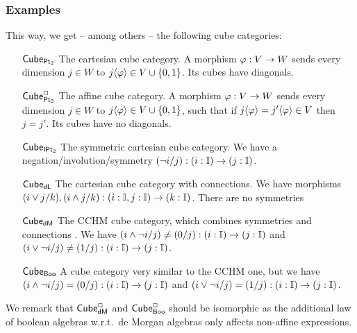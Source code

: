 \documentclass[a4paper]{article}
\begin{document}
\subsubsection{Examples}
This way, we get -- among others -- the following cube categories:
\begin{enumerate}
	\item[${\mathsf{Cube}}_{{\mathsf{Pt}_2}}$] The cartesian cube category.
	A morphism $\varphi : V \to W$ sends every dimension $j \in W$ to $j \langle \varphi \rangle \in V \cup \mathopen{}\left\{ 0, 1 \right\}\mathclose{}$.
	Its cubes have diagonals.
	\item[${\mathsf{Cube}}^\Box_{{\mathsf{Pt}_2}}$] The affine cube category.
	A morphism $\varphi : V \to W$ sends every dimension $j \in W$ to $j \langle \varphi \rangle \in V \cup \mathopen{}\left\{ 0, 1 \right\}\mathclose{}$, such that if $j\langle \varphi \rangle = j' \langle \varphi \rangle \in V$ then $j = j'$.
	Its cubes have no diagonals.
	\item[${\mathsf{Cube}}_{{\mathsf{IPt}_2}}$] The symmetric cartesian cube category. We have a negation/involution/symmetry $(\lnot i / j) : (i : {\mathbb I}) \to (j : {\mathbb I})$.
	\item[${\mathsf{Cube}}_{\mathsf{dL}}$] The cartesian cube category with connections. We have morphisms $(i \vee j / k), (i \wedge j / k) : (i : {\mathbb I}, j : {\mathbb I}) \to (k : {\mathbb I})$. There are no symmetries
	\item[${\mathsf{Cube}}_{\mathsf{dM}}$] The CCHM cube category, which combines symmetries and connections \cite{cubical}. We have $(i \wedge \lnot i / j) \neq (0/j) : (i : {\mathbb I}) \to (j : {\mathbb I})$ and $(i \vee \lnot i / j) \neq (1/j) : (i : {\mathbb I}) \to (j : {\mathbb I})$.
	\item[${\mathsf{Cube}}_{\mathsf{Boo}}$] A cube category very similar to the CCHM one, but we have $(i \wedge \lnot i / j) = (0/j) : (i : {\mathbb I}) \to (j : {\mathbb I})$ and $(i \vee \lnot i / j) = (1/j) : (i : {\mathbb I}) \to (j : {\mathbb I})$.
\end{enumerate}
We remark that ${\mathsf{Cube}}^\Box_{\mathsf{dM}}$ and ${\mathsf{Cube}}^\Box_{\mathsf{Boo}}$ should be isomorphic as the additional law of boolean algebras w.r.t.\ de Morgan algebras only affects non-affine expressions.

\end{document}
